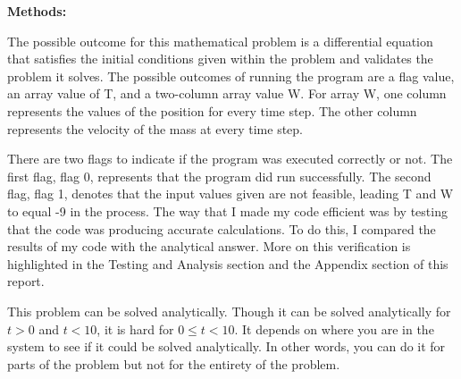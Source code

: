 \documentclass{article}
\begin{document}
{\bf Methods:} {\color{black} The possible outcome for this mathematical problem is a differential equation that satisfies the initial conditions given within the problem and validates the problem it solves.  The possible outcomes of running the program are a flag value, an array value of T, and a two-column array value W.  For array W, one column represents the values of the position for every time step.  The other column represents the velocity of the mass at every time step.  
\par \medskip \par
There are two flags to indicate if the program was executed correctly or not.  The first flag, flag 0, represents that the program did run successfully.  The second flag, flag 1, denotes that the input values given are not feasible, leading T and W to equal -9 in the process.  
The way that I made my code efficient was by testing that the code was producing accurate calculations.  To do this, I compared the results of my code with the analytical answer.  More on this verification is highlighted in the Testing and Analysis section and the Appendix section of this report.
\par \medskip \par
This problem can be solved analytically.  Though it can be solved analytically for $t > 0$ and $t < 10$, it is hard for $0\leq t<10$.  It depends on where you are in the system to see if it could be solved analytically.  In other words, you can do it for parts of the problem but not for the entirety of the problem.
 }
\par \bigskip \par
\end{document}
